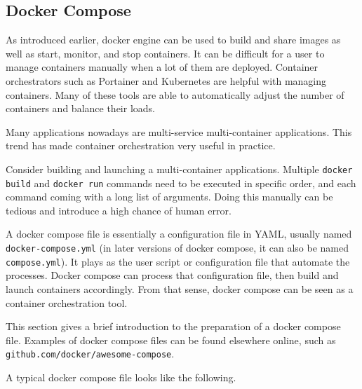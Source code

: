 \subsection{Docker Compose}

As introduced earlier, docker engine can be used to build and share images as well as start, monitor, and stop containers. It can be difficult for a user to manage containers manually when a lot of them are deployed. Container orchestrators such as Portainer and Kubernetes are helpful with managing containers. Many of these tools are able to automatically adjust the number of containers and balance their loads.

Many applications nowadays are multi-service multi-container applications. This trend has made container orchestration very useful in practice.

Consider building and launching a multi-container applications. Multiple \verb|docker build| and \verb|docker run| commands need to be executed in specific order, and each command coming with a long list of arguments. Doing this manually can be tedious and introduce a high chance of human error.

A docker compose file is essentially a configuration file in YAML, usually named \verb|docker-compose.yml| (in later versions of docker compose, it can also be named \verb|compose.yml|). It plays as the user script or configuration file that automate the processes. Docker compose can process that configuration file, then build and launch containers accordingly. From that sense, docker compose can be seen as a container orchestration tool. 

This section gives a brief introduction to the preparation of a docker compose file. Examples of docker compose files can be found elsewhere online, such as \texttt{github.com/docker/awesome-compose}. 

A typical docker compose file looks like the following.

